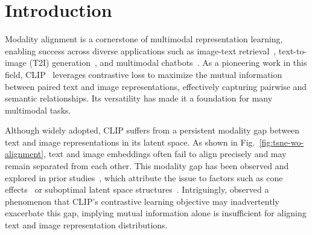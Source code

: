 \section{{Introduction}}
\label{sec:intro}





Modality alignment is a cornerstone of multimodal representation learning, enabling success across diverse applications such as image-text retrieval~\citep{huang2024llm2clip,koukounas2024jina}, text-to-image (T2I) generation~\citep{ramesh2022hierarchical, razzhigaev2023kandinsky}, and multimodal chatbots~\citep{zhu2023minigpt}. As a pioneering work in this field, CLIP~\cite{radford2021learning} leverages contrastive loss to maximize the mutual information between paired text and image representations, effectively capturing pairwise and semantic relationships. Its versatility has made it a foundation for many multimodal tasks. %



Although widely adopted, CLIP suffers from a persistent modality gap between text and image representations in its latent space. As shown in Fig.~\ref{fig:tsne-wo-alignment}, text and image embeddings often fail to align precisely and may remain separated from each other. This modality gap has been observed and explored in prior studies~\citep{zhou2023clip, liang2022mind, shi2023towards}, which attribute the issue to factors such as cone effects~\cite{liang2022mind} or suboptimal latent space structures~\citep{shi2023towards}. Intriguingly, \citet{liang2022mind} observed a phenomenon that CLIP’s contrastive learning objective may inadvertently exacerbate this gap, implying mutual information alone is insufficient for aligning text and image representation distributions.


